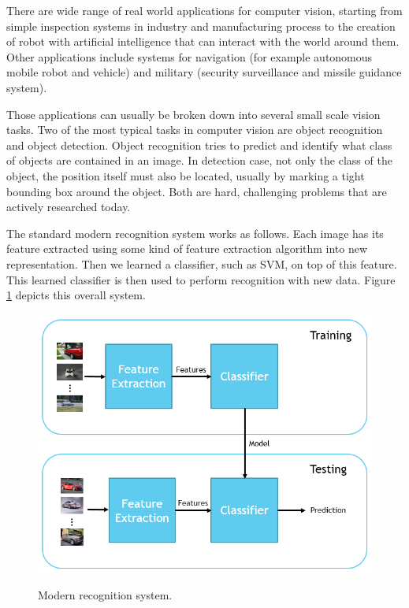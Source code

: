 \documentclass[a4paper,11pt]{kth-mag}
\begin{document}
There are wide range of real world applications for computer vision, starting from simple inspection systems in industry and manufacturing process to the creation of robot with artificial intelligence that can interact with  the world around them. Other applications include systems for navigation (for example autonomous mobile robot and vehicle) and military (security surveillance and missile guidance system).

Those applications can usually be broken down into several small scale vision tasks. Two of the most typical tasks in computer vision are object recognition and object detection. Object recognition tries to predict and identify what class of objects are contained in an image. In detection case, not only the class of the object, the position itself must also be located, usually by marking a tight bounding box around the object. Both are hard, challenging problems that are actively researched today.

The standard modern recognition system works as follows. Each image has its feature extracted using some kind of feature extraction algorithm into new representation. Then we learned a classifier, such as SVM, on top of this feature. This learned classifier is then used to perform recognition with new data. Figure \ref{fig:scheme} depicts this overall system.

\begin{figure}[h]
\centering
\includegraphics[scale=0.5]{image/scheme.png}
\label{fig:scheme}
\caption{Modern recognition system.}
\end{figure}
\end{document}
